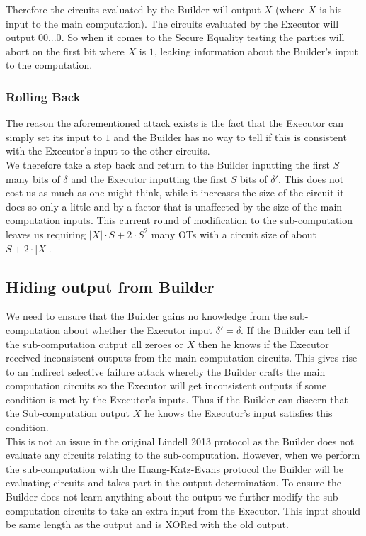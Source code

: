 \documentclass[ %
                    author={Nicholas Tutte},
                supervisor={Prof. Nigel Smart},
                    degree={MEng},
                     title={Secure Two Party Computation},
                  subtitle={A practical comparison of recent protocols},
                      type={Research - GG1K},
                      year={2015} ]{dissertation}
\begin{document}
					Therefore the circuits evaluated by the Builder will output $X$ (where $X$ is his input to the main computation). The circuits evaluated by the Executor will output $00...0$. So when it comes to the Secure Equality testing the parties will abort on the first bit where $X$ is $1$, leaking information about the Builder's input to the computation.\\

				\subsubsection{Rolling Back}
					The reason the aforementioned attack exists is the fact that the Executor can simply set its input to $1$ and the Builder has no way to tell if this is consistent with the Executor's input to the other circuits.\\

					We therefore take a step back and return to the Builder inputting the first $S$ many bits of $\delta$ and the Executor inputting the first $S$ bits of $\delta'$. This does not cost us as much as one might think, while it increases the size of the circuit it does so only a little and by a factor that is unaffected by the size of the main computation inputs. This current round of modification to the sub-computation leaves us requiring $|X| \cdot S + 2 \cdot S^2$ many OTs with a circuit size of about $S + 2 \cdot |X|$.

			\subsection{Hiding output from Builder}
				We need to ensure that the Builder gains no knowledge from the sub-computation about whether the Executor input $\delta' = \delta$. If the Builder can tell if the sub-computation output all zeroes or $X$ then he knows if the Executor received inconsistent outputs from the main computation circuits. This gives rise to an indirect selective failure attack whereby the Builder crafts the main computation circuits so the Executor will get inconsistent outputs if some condition is met by the Executor's inputs. Thus if the Builder can discern that the Sub-computation output $X$ he knows the Executor's input satisfies this condition.\\

				This is not an issue in the original Lindell 2013 protocol as the Builder does not evaluate any circuits relating to the sub-computation. However, when we perform the sub-computation with the Huang-Katz-Evans protocol the Builder will be evaluating circuits and takes part in the output determination. To ensure the Builder does not learn anything about the output we further modify the sub-computation circuits to take an extra input from the Executor. This input should be same length as the output and is XORed with the old output.\\
\end{document}
